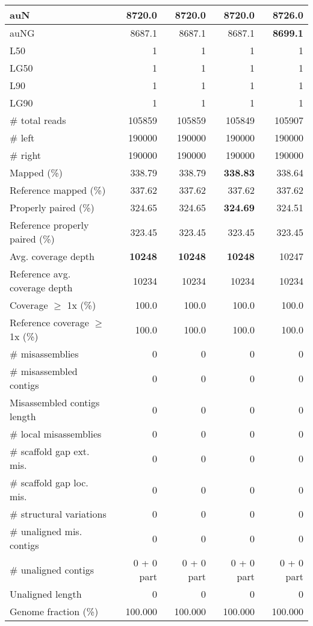 \documentclass[12pt,a4paper]{article}
\begin{document}
\begin{table}[ht]
\begin{center}
\begin{tabular}{|l*{4}{|r}|}
auN & 8720.0 & 8720.0 & 8720.0 & {\bf 8726.0} \\ \hline
auNG & 8687.1 & 8687.1 & 8687.1 & {\bf 8699.1} \\ \hline
L50 & 1 & 1 & 1 & 1 \\ \hline
LG50 & 1 & 1 & 1 & 1 \\ \hline
L90 & 1 & 1 & 1 & 1 \\ \hline
LG90 & 1 & 1 & 1 & 1 \\ \hline
\# total reads & 105859 & 105859 & 105849 & 105907 \\ \hline
\# left & 190000 & 190000 & 190000 & 190000 \\ \hline
\# right & 190000 & 190000 & 190000 & 190000 \\ \hline
Mapped (\%) & 338.79 & 338.79 & {\bf 338.83} & 338.64 \\ \hline
Reference mapped (\%) & 337.62 & 337.62 & 337.62 & 337.62 \\ \hline
Properly paired (\%) & 324.65 & 324.65 & {\bf 324.69} & 324.51 \\ \hline
Reference properly paired (\%) & 323.45 & 323.45 & 323.45 & 323.45 \\ \hline
Avg. coverage depth & {\bf 10248} & {\bf 10248} & {\bf 10248} & 10247 \\ \hline
Reference avg. coverage depth & 10234 & 10234 & 10234 & 10234 \\ \hline
Coverage $\geq$ 1x (\%) & 100.0 & 100.0 & 100.0 & 100.0 \\ \hline
Reference coverage $\geq$ 1x (\%) & 100.0 & 100.0 & 100.0 & 100.0 \\ \hline
\# misassemblies & 0 & 0 & 0 & 0 \\ \hline
\# misassembled contigs & 0 & 0 & 0 & 0 \\ \hline
Misassembled contigs length & 0 & 0 & 0 & 0 \\ \hline
\# local misassemblies & 0 & 0 & 0 & 0 \\ \hline
\# scaffold gap ext. mis. & 0 & 0 & 0 & 0 \\ \hline
\# scaffold gap loc. mis. & 0 & 0 & 0 & 0 \\ \hline
\# structural variations & 0 & 0 & 0 & 0 \\ \hline
\# unaligned mis. contigs & 0 & 0 & 0 & 0 \\ \hline
\# unaligned contigs & 0 + 0 part & 0 + 0 part & 0 + 0 part & 0 + 0 part \\ \hline
Unaligned length & 0 & 0 & 0 & 0 \\ \hline
Genome fraction (\%) & 100.000 & 100.000 & 100.000 & 100.000 \\ \hline

\end{tabular}
\end{center}
\end{table}
\end{document}
